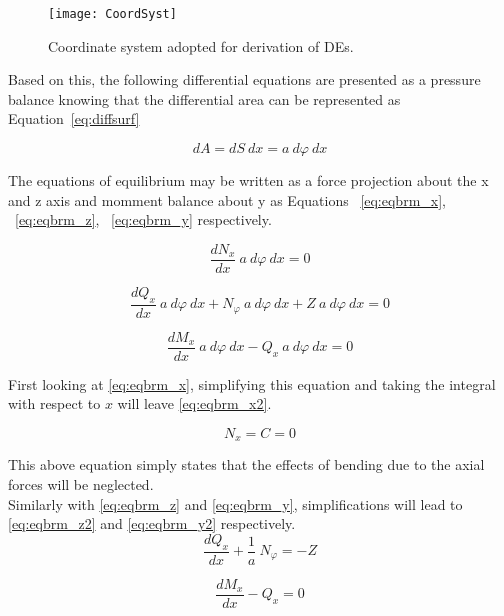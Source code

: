\begin{figure}[!htbp]
    \centering
    \texttt{[image: CoordSyst]}
    \caption{Coordinate system adopted for derivation of DEs.}
    \label{fig:CoordSyst}
\end{figure}

Based on this, the following differential equations are presented as a pressure balance knowing that the differential area can be represented as Equation~\ref{eq:diffsurf}
 
\begin{equation}
\label{eq:diffsurf}
dA = dS\ dx = a\ d\varphi \ dx   
\end{equation}

The equations of equilibrium may be written as a force projection about the x and z axis and momment balance about y as Equations ~\ref{eq:eqbrm_x}, ~\ref{eq:eqbrm_z}, ~\ref{eq:eqbrm_y} respectively.

\begin{equation}
\label{eq:eqbrm_x}
\frac{dN_x}{dx}\ a\ d\varphi \ dx = 0
\end{equation}

\begin{equation}
\label{eq:eqbrm_z}
\frac{dQ_x}{dx}\ a\ d\varphi \ dx+ N_\varphi \ a\ d\varphi \ dx +Z\ a\ d\varphi \ dx= 0
\end{equation}

\begin{equation}
\label{eq:eqbrm_y}
\frac{dM_x}{dx}\ a\ d\varphi \ dx- Q_x\ a\ d\varphi \ dx= 0
\end{equation}

First looking at \ref{eq:eqbrm_x}, simplifying this equation and taking the integral with respect to $x$ will leave \ref{eq:eqbrm_x2}. 

\begin{equation}
\label{eq:eqbrm_x2}
N_x = C = 0 
\end{equation}

This above equation simply states that the effects of bending due to the axial forces will be neglected.\\

Similarly with \ref{eq:eqbrm_z} and \ref{eq:eqbrm_y}, simplifications will lead to \ref{eq:eqbrm_z2} and \ref{eq:eqbrm_y2} respectively.
\begin{equation}
\label{eq:eqbrm_z2}
\frac{dQ_x}{dx}+\frac{1}{a}\ N_\varphi = -Z
\end{equation}

\begin{equation}
\label{eq:eqbrm_y2}
\frac{dM_x}{dx}- Q_x= 0
\end{equation} 

